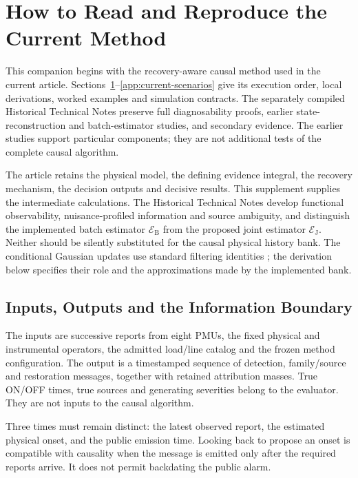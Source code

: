 \section{How to Read and Reproduce the Current Method}
\label{app:causal-walkthrough}

This companion begins with the recovery-aware causal method used in the
current article. Sections~\ref{app:causal-walkthrough}--\ref{app:current-scenarios}
give its execution order, local derivations, worked examples and simulation
contracts. The separately compiled Historical Technical Notes preserve
full diagnosability proofs, earlier state-reconstruction and batch-estimator
studies, and secondary evidence. The earlier studies support particular
components; they are not additional tests of the complete causal algorithm.

The article retains the physical model, the defining evidence integral,
the recovery mechanism, the decision outputs and decisive results. This
supplement supplies the intermediate calculations. The Historical Technical
Notes develop functional observability, nuisance-profiled information and
source ambiguity, and distinguish the implemented batch estimator $\mathcal E_{\mathrm B}$ from
the proposed joint estimator $\mathcal E_{\mathrm J}$. Neither should be
silently substituted for the causal physical history bank.
The conditional Gaussian updates use standard filtering identities
\cite{sarkka2013bayesian}; the derivation below specifies their role and
the approximations made by the implemented bank.

\subsection{Inputs, Outputs and the Information Boundary}

The inputs are successive reports from eight PMUs, the fixed physical and
instrumental operators, the admitted load/line catalog and the frozen
method configuration. The output is a timestamped sequence of detection,
family/source and restoration messages, together with retained attribution
masses. True ON/OFF times, true sources and generating severities belong
to the evaluator. They are not inputs to the causal algorithm.

Three times must remain distinct: the latest observed report, the estimated
physical onset, and the public emission time. Looking back to propose an
onset is compatible with causality when the message is emitted only after
the required reports arrive. It does not permit backdating the public alarm.

